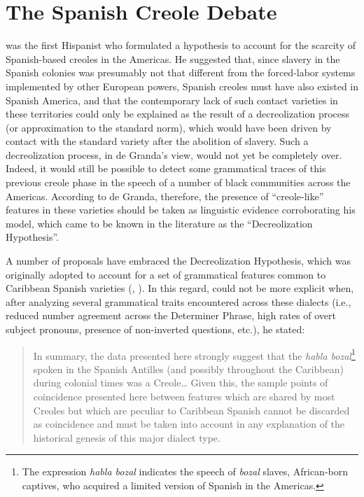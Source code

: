 \documentclass[output=paper,colorlinks,citecolor=brown]{langscibook}
\begin{document}
\section{The Spanish Creole Debate} \label{sec:visconti:2}

\Textcite{Grandade1968, Grandade1970, Grandade1978} was the first Hispanist who formulated a hypothesis to account for the scarcity of Spanish-based creoles in the Americas. He suggested that, since slavery in the Spanish colonies was presumably not that different from the forced-labor systems implemented by other European powers, Spanish creoles must have also existed in Spanish America, and that the contemporary lack of such contact varieties in these territories could only be explained as the result of a decreolization process (or approximation to the standard norm), which would have been driven by contact with the standard variety after the abolition of slavery. Such a decreolization process, in de Granda’s view, would not yet be completely over. Indeed, it would still be possible to detect some grammatical traces of this previous creole phase in the speech of a number of black communities across the Americas. According to de Granda, therefore, the presence of “creole-like” features in these varieties should be taken as linguistic evidence corroborating his model, which came to be known in the literature as the “Decreolization Hypothesis”.

A number of proposals have embraced the Decreolization Hypothesis, which was originally adopted to account for a set of grammatical features common to Caribbean Spanish varieties (\citealt{Otheguy1973, Schwegler1991,Schwegler1996}, \citealt{Megenney1993}). In this regard, \citet[334--335]{Otheguy1973} could not be more explicit when, after analyzing several grammatical traits encountered across these dialects (i.e., reduced number agreement across the Determiner Phrase, high rates of overt subject pronouns, presence of non-inverted questions, etc.), he stated:

\begin{quote}
In summary, the data presented here strongly suggest that the \textit{habla bozal}\footnote{The expression \textit{habla bozal} indicates the speech of \textit{bozal} slaves, African-born captives, who acquired a limited version of Spanish in the Americas.}  spoken in the Spanish Antilles (and possibly throughout the Caribbean) during colonial times was a Creole… Given this, the sample points of coincidence presented here between features which are shared by most Creoles but which are peculiar to Caribbean Spanish cannot be discarded as coincidence and must be taken into account in any explanation of the historical genesis of this major dialect type.
\end{quote}
\end{document}

